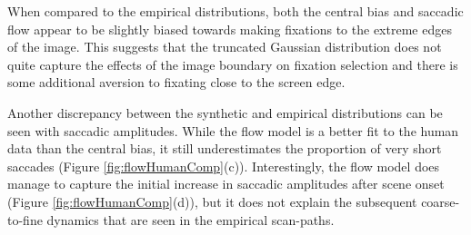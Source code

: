 When compared to the empirical distributions, both the central bias and saccadic flow appear to be slightly biased towards making fixations to the extreme edges of the image. This suggests that the truncated Gaussian distribution does not quite capture the effects of the image boundary on fixation selection and there is some additional aversion to fixating close to the screen edge. 

Another discrepancy between the synthetic and empirical distributions can be seen with saccadic amplitudes. While the flow model is a better fit to the human data than the central bias, it still underestimates the proportion of very short saccades (Figure \ref{fig:flowHumanComp}(c)). Interestingly, the flow model does manage to capture the initial increase in saccadic amplitudes after scene onset (Figure \ref{fig:flowHumanComp}(d)), but it does not explain the subsequent coarse-to-fine dynamics that are seen in the empirical scan-paths. 


